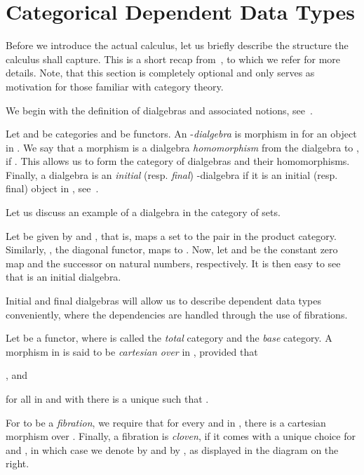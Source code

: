 \documentclass[preprint]{sigplanconf}
\begin{document}
 \section{Categorical Dependent Data Types}
\label{sec:dtcc}

Before we introduce the actual calculus, let us briefly describe the structure
the calculus shall capture.
This is a short recap from~\cite{Basold-DepCoindFibDialg}, to which we refer
for more details.
Note, that this section is completely optional and only serves as
motivation for those familiar with category theory.

We begin with the definition of dialgebras and associated notions,
see~\cite{Hagino-Dialg}.
\begin{definition}
  \label{def:dialgebra}
  Let  and  be categories and  be
  functors.
  An -\emph{dialgebra} is morphism  in  for
  an object  in .
  We say that a morphism  is a dialgebra \emph{homomorphism}
  from the dialgebra  to
  , if .
  This allows us to form the category  of dialgebras and their
  homomorphisms.
  Finally, a dialgebra is an \emph{initial} (resp. \emph{final})
  -dialgebra if it is an initial (resp. final) object in ,
  see~\cite{Basold-DepCoindFibDialg}.
\end{definition}

Let us discuss an example of a dialgebra in the category of sets.
\begin{example}
  Let  be given by
   and , that is,  maps a
  set  to the pair  in the product category.
  Similarly, , the diagonal functor, maps  to .
  Now, let  and  be the constant zero map
  and the successor on natural numbers, respectively.
  It is then easy to see that  is an initial
  dialgebra.
  \qedDef
\end{example}

Initial and final dialgebras will allow us to describe dependent data types
conveniently, where the dependencies are handled through the use of fibrations.
\begin{definition}
  \label{def:fibration}
  Let  be a functor, where  is called the
  \emph{total} category and  the \emph{base} category.
  A morphism  in  is said to be \emph{cartesian over}
   in , provided that
  \begin{enumerate*}[label=\roman*)]
  \item , and
  \item for all  in  and  with
     there is a unique  such that .
  \end{enumerate*}
  For  to be a \emph{fibration}, we require that
  for every  and  in , there is
  a cartesian morphism  over .
  Finally, a fibration is \emph{cloven}, if it comes with a unique choice
  for  and , in which case we denote  by  and
   by , as displayed in the diagram on the right.
\end{definition}
\end{document}
